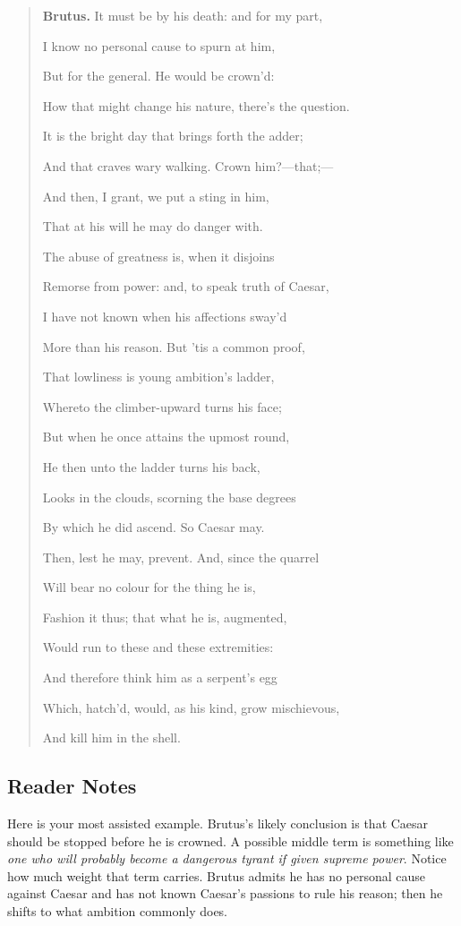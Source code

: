 \documentclass[12pt]{article}
\newenvironment{playpassage}{\begin{quote}\small\setlength{\parskip}{0.25em}}{\end{quote}}
\newcommand{\speaker}[1]{\textbf{#1.}}
\begin{document}
\begin{playpassage}
\speaker{Brutus} It must be by his death: and for my part,\par
I know no personal cause to spurn at him,\par
But for the general. He would be crown'd:\par
How that might change his nature, there's the question.\par
It is the bright day that brings forth the adder;\par
And that craves wary walking. Crown him?---that;---\par
And then, I grant, we put a sting in him,\par
That at his will he may do danger with.\par
The abuse of greatness is, when it disjoins\par
Remorse from power: and, to speak truth of Caesar,\par
I have not known when his affections sway'd\par
More than his reason. But 'tis a common proof,\par
That lowliness is young ambition's ladder,\par
Whereto the climber-upward turns his face;\par
But when he once attains the upmost round,\par
He then unto the ladder turns his back,\par
Looks in the clouds, scorning the base degrees\par
By which he did ascend. So Caesar may.\par
Then, lest he may, prevent. And, since the quarrel\par
Will bear no colour for the thing he is,\par
Fashion it thus; that what he is, augmented,\par
Would run to these and these extremities:\par
And therefore think him as a serpent's egg\par
Which, hatch'd, would, as his kind, grow mischievous,\par
And kill him in the shell.
\end{playpassage}

\subsection*{Reader Notes}

Here is your most assisted example. Brutus's likely conclusion is that Caesar should be stopped before he is crowned. A possible middle term is something like \textit{one who will probably become a dangerous tyrant if given supreme power}. Notice how much weight that term carries. Brutus admits he has no personal cause against Caesar and has not known Caesar's passions to rule his reason; then he shifts to what ambition commonly does.
\end{document}

